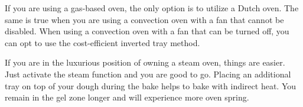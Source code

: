 If you are using a gas-based oven, the only option
is to utilize a Dutch oven. The same is true when you
are using a convection oven with a fan that
cannot be disabled. When using a convection
oven with a fan that can be turned off, you can
opt to use the cost-efficient inverted tray
method.

If you are in the luxurious
position of owning a steam oven, things are easier.
Just activate the steam function and you are
good to go. Placing an additional tray on top of your
dough during the bake helps to bake with indirect
heat. You remain in the gel zone longer and
will experience more oven spring.
